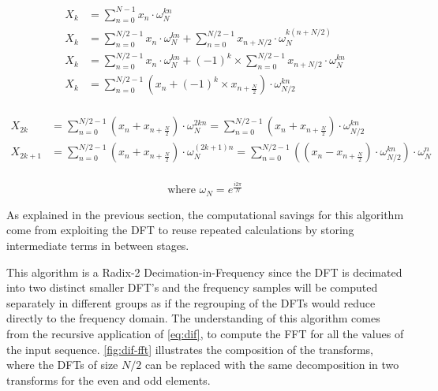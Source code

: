 \documentclass[
  oneside,
  11pt, a4paper,
  footinclude=true,
  headinclude=true,
  cleardoublepage=empty
]{scrbook}
\begin{document}
\begin{equation}
    \begin{split}
        X_{k} &= \sum_{n=0}^{N-1}x_{n} \cdot \omega_{N}^{kn} \\
        X_{k} &= \sum_{n=0}^{N/2-1}x_{n} \cdot \omega_{N}^{kn} + \sum_{n=0}^{N/2-1}x_{n+N/2} \cdot \omega_{N}^{k(n+N/2)} \\
        X_{k} &= \sum_{n=0}^{N/2-1}x_{n} \cdot \omega_{N}^{kn} + (-1)^k \times \sum_{n=0}^{N/2-1}x_{n+N/2} \cdot \omega_{N}^{kn} \\
        X_{k} &= \sum_{n=0}^{N/2-1} (x_{n} + (-1)^{k} \times x_{n + \frac{N}{2}}) \cdot \omega_{N/2}^{kn} \\
    \end{split}
\end{equation}


\begin{equation} \label{eq:dif}
    \begin{split}
        X_{2k} &= \sum_{n=0}^{N/2-1} (x_{n} + x_{n + \frac{N}{2}}) \cdot \omega_{N}^{2kn} = \sum_{n=0}^{N/2-1} (x_{n} + x_{n + \frac{N}{2}}) \cdot \omega_{N/2}^{kn} \\
        X_{2k+1} &= \sum_{n=0}^{N/2-1} (x_{n} + x_{n + \frac{N}{2}}) \cdot \omega_{N}^{(2k+1)n} = \sum_{n=0}^{N/2-1} ((x_{n} - x_{n + \frac{N}{2}}) \cdot \omega_{N/2}^{kn}) \cdot \omega_{N}^{n} \\
    \end{split}
\end{equation}

\begin{equation*}
    \text{where } \omega_{N} = e^{\frac{i 2 \pi}{N}}
\end{equation*}


As explained in the previous section, the computational savings for this algorithm come from exploiting the DFT to reuse repeated calculations by storing intermediate terms in between stages.


This algorithm is a Radix-2 Decimation-in-Frequency since the DFT is decimated into two distinct smaller DFT's and the frequency samples will be computed separately in different groups as if the regrouping of the DFTs would reduce directly to the frequency domain. The understanding of this algorithm comes from the recursive application of \autoref{eq:dif}, to compute the FFT for all the values of the input sequence. \autoref{fig:dif-fft} illustrates the composition of the transforms, where the DFTs of size $N/2$ can be replaced with the same decomposition in two transforms for the even and odd elements.
\end{document}
